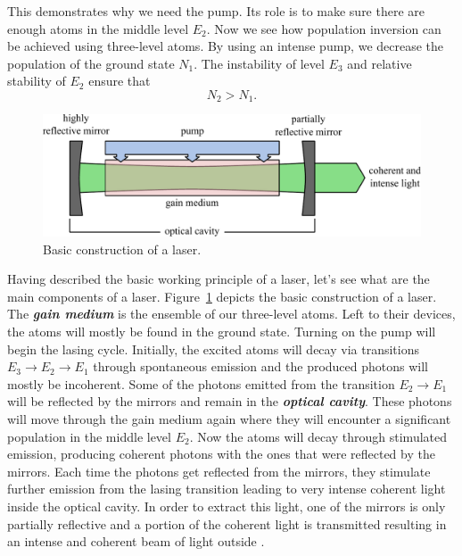 This demonstrates why we need the pump.
Its role is to make sure there are enough atoms in the middle level $E_2$.
Now we see how population inversion can be achieved using three-level atoms.
By using an intense pump, we decrease the population of the ground state $N_1$.
The instability of level $E_3$ and relative stability of $E_2$ ensure that
\begin{equation}
    N_2 > N_1.
\end{equation}

\begin{figure}[t]
    \centering
    \includegraphics[width=\textwidth]{lesson5/5-4_laser construction.pdf}
    \caption[Laser construction]{Basic construction of a laser.}
    \label{fig:5-4_laser_construction}
\end{figure}

Having described the basic working principle of a laser, let's see what are the main components of a laser.
Figure~\ref{fig:5-4_laser_construction} depicts the basic construction of a laser.
The \textit{\textbf{gain medium}} is the ensemble of our three-level atoms.
Left to their devices, the atoms will mostly be found in the ground state.
Turning on the pump will begin the lasing cycle.
Initially, the excited atoms will decay via transitions $E_3 \rightarrow E_2 \rightarrow E_1$ through spontaneous emission and the produced photons will mostly be incoherent.
Some of the photons emitted from the transition $E_2 \rightarrow E_1$ will be reflected by the mirrors and remain in the \textit{\textbf{optical cavity}}.
These photons will move through the gain medium again where they will encounter a significant population in the middle level $E_2$.
Now the atoms will decay through stimulated emission, producing coherent photons with the ones that were reflected by the mirrors.
Each time the photons get reflected from the mirrors, they stimulate further emission from the lasing transition leading to very intense coherent light inside the optical cavity.
In order to extract this light, one of the mirrors is only partially reflective and a portion of the coherent light is transmitted resulting in an intense and coherent beam of light outside .


